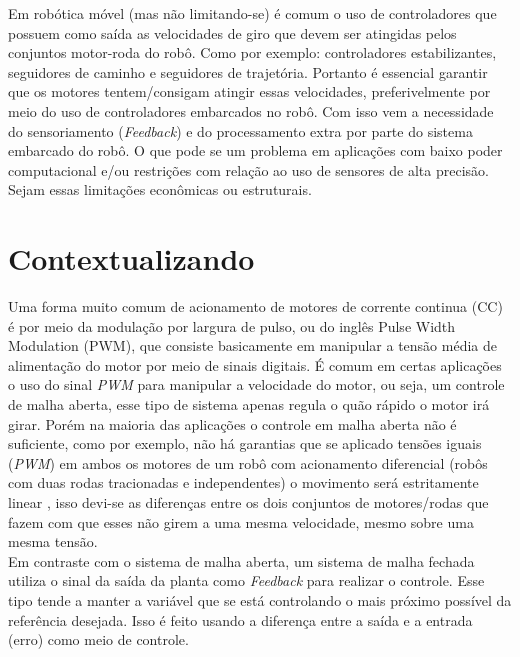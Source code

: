 Em robótica móvel (mas não limitando-se) é comum o uso de controladores que possuem como saída as velocidades de giro que devem ser atingidas pelos conjuntos motor-roda do robô. Como por exemplo: controladores estabilizantes, seguidores de caminho e seguidores de trajetória. Portanto é essencial garantir que os motores tentem/consigam atingir essas velocidades, preferivelmente por meio do uso de controladores embarcados no robô. Com isso vem a necessidade do sensoriamento (\emph{Feedback}) e do processamento extra por parte do sistema embarcado do robô. O que pode se um problema em aplicações com baixo poder computacional e/ou restrições com relação ao uso de sensores de alta precisão. Sejam essas limitações econômicas ou estruturais.\\

\section{Contextualizando}
Uma forma muito comum de acionamento de motores de corrente continua (CC) é por meio da modulação por largura de pulso, ou do inglês Pulse Width Modulation (PWM), que consiste basicamente em manipular a tensão média de alimentação do motor por meio de sinais digitais. É comum em certas aplicações o uso do sinal \emph{PWM} para manipular a velocidade do motor, ou seja, um controle de malha aberta, esse tipo de sistema apenas regula o quão rápido o motor irá girar. Porém na maioria das aplicações o controle em malha aberta não é suficiente, como por exemplo, não há garantias que se aplicado tensões iguais (\emph{PWM}) em ambos os motores de um robô com acionamento diferencial (robôs com duas rodas tracionadas e independentes) o movimento será estritamente linear \cite{simple_speed_feedback}, isso devi-se as diferenças entre os dois conjuntos de motores/rodas que fazem com que esses não girem a uma mesma velocidade, mesmo sobre uma mesma tensão.\\

Em contraste com o sistema de malha aberta, um sistema de malha fechada utiliza o sinal da saída da planta como \emph{Feedback} para realizar o controle. Esse tipo tende a manter a variável que se está controlando o mais próximo possível da referência desejada. Isso é feito usando a diferença entre a saída e a entrada (erro) como meio de controle. \\ %

